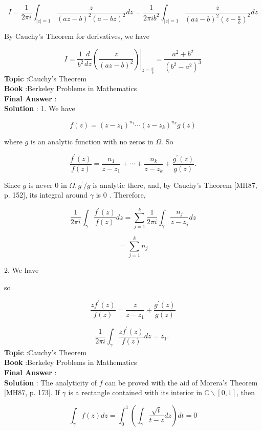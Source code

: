 \documentclass[10pt]{article}
\begin{document}
$$
I=\frac{1}{2 \pi i} \int_{|z|=1} \frac{z}{(a z-b)^{2}(a-b z)^{2}} d z=\frac{1}{2 \pi i b^{2}} \int_{|z|=1} \frac{z}{(a z-b)^{2}\left(z-\frac{a}{b}\right)^{2}} d z
$$

By Cauchy's Theorem for derivatives, we have

$$
I=\left.\frac{1}{b^{2}} \frac{d}{d z}\left(\frac{z}{(a z-b)^{2}}\right)\right|_{z=\frac{a}{b}}=\frac{a^{2}+b^{2}}{\left(b^{2}-a^{2}\right)^{3}}
$$
\textbf{Topic} :Cauchy's Theorem \\
\textbf{Book} :Berkeley Problems in Mathematics\\
\textbf{Final Answer} :\\


\textbf{Solution} : 1. We have

$$
f(z)=\left(z-z_{1}\right)^{n_{1}} \cdots\left(z-z_{k}\right)^{n_{k}} g(z)
$$

where $g$ is an analytic function with no zeros in $\Omega$. So

$$
\frac{f^{\prime}(z)}{f(z)}=\frac{n_{1}}{z-z_{1}}+\cdots+\frac{n_{k}}{z-z_{k}}+\frac{g^{\prime}(z)}{g(z)} .
$$

Since $g$ is never 0 in $\Omega, g^{\prime} / g$ is analytic there, and, by Cauchy's Theorem [MH87, p. 152], its integral around $\gamma$ is 0 . Therefore,

$$
\frac{1}{2 \pi i} \int_{\gamma} \frac{f^{\prime}(z)}{f(z)} d z=\sum_{j=1}^{k} \frac{1}{2 \pi i} \int_{\gamma} \frac{n_{j}}{z-z_{j}} d z
$$



$$
=\sum_{j=1}^{k} n_{j}
$$

2. We have

so

$$
\frac{z f^{\prime}(z)}{f(z)}=\frac{z}{z-z_{1}}+\frac{g^{\prime}(z)}{g(z)}
$$

$$
\frac{1}{2 \pi i} \int_{\gamma} \frac{z f^{\prime}(z)}{f(z)} d z=z_{1} \text {. }
$$
\textbf{Topic} :Cauchy's Theorem \\
\textbf{Book} :Berkeley Problems in Mathematics\\
\textbf{Final Answer} :\\


\textbf{Solution} : The analyticity of $f$ can be proved with the aid of Morera's Theorem [MH87, p. 173]. If $\gamma$ is a rectangle contained with its interior in $\mathbb{C} \backslash[0,1]$, then

$$
\int_{\gamma} f(z) d z=\int_{0}^{1}\left(\int_{\gamma} \frac{\sqrt{t}}{t-z} d z\right) d t=0
$$
\end{document}
